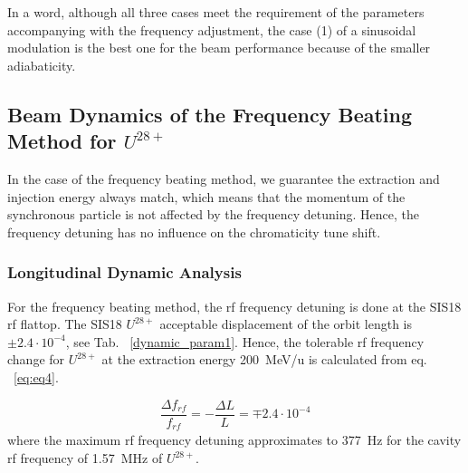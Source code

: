 In a word, although all three cases meet the requirement of the parameters accompanying with the frequency adjustment, the case (1) of a sinusoidal modulation is the best one for the beam performance because of the smaller adiabaticity.  
\subsection{Beam Dynamics of the Frequency Beating Method for $U^\mathit{28+}$} 
In the case of the frequency beating method, we guarantee the extraction and injection energy always match, which means that the momentum of the synchronous particle is not affected by the frequency detuning. Hence, the frequency detuning has no influence on the chromaticity tune shift.

\subsubsection{Longitudinal Dynamic Analysis}
 
For the frequency beating method, the rf frequency detuning is done at the SIS18 rf flattop. The SIS18 $U^\mathit{28+}$ acceptable displacement of the orbit length is $\pm2.4\cdot 10^{-4}$, see Tab. ~\ref{dynamic_param1}. Hence, the tolerable rf frequency change for $U^{28+}$ at the extraction energy \SI{200}{MeV/u} is calculated from eq. ~\ref{eq:eq4}.

\begin{equation}
\frac{\Delta{f}_\mathit{rf}}{f_\mathit{rf}} = -\frac{\Delta L}{L}= \mp 2.4 \cdot 10^{-4}
\end{equation}
where the maximum rf frequency detuning approximates to \SI{377}{Hz} for the cavity rf frequency of \SI{1.57}{MHz} of $U^{28+}$.

